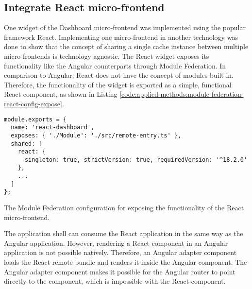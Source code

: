 \subsection{Integrate React micro-frontend}\label{subsection:applied-methods:prototypical-implementation:react-micro-frontend}

One widget of the Dashboard micro-frontend was implemented using the popular framework React. Implementing one micro-frontend in another technology was done to show that the concept of sharing a single cache instance between multiple micro-frontends is technology agnostic. The React widget exposes its functionality like the Angular counterparts through Module Federation. In comparison to Angular, React does not have the concept of modules built-in. Therefore, the functionality of the widget is exported as a simple, functional React component, as shown in Listing  \ref{code:applied-methods:module-federation-react-config-expose}.

\ifshowListings
\begin{listing}[H]
  \begin{verbatim}
module.exports = {
  name: 'react-dashboard',
  exposes: { './Module': './src/remote-entry.ts' },
  shared: [
    react: {
      singleton: true, strictVersion: true, requiredVersion: '^18.2.0' 
    },
    ...
  ]
};
  \end{verbatim}
  \caption{The Module Federation configuration for exposing the functionality of the React micro-frontend.}\label{code:applied-methods:module-federation-react-config-expose}
\end{listing}
\fi

\noindent The application shell can consume the React application in the same way as the Angular application. However, rendering a React component in an Angular application is not possible natively. Therefore, an Angular adapter component loads the React remote bundle and renders it inside the Angular component. The Angular adapter component makes it possible for the Angular router to point directly to the component, which is impossible with the React component.

\bigskip

